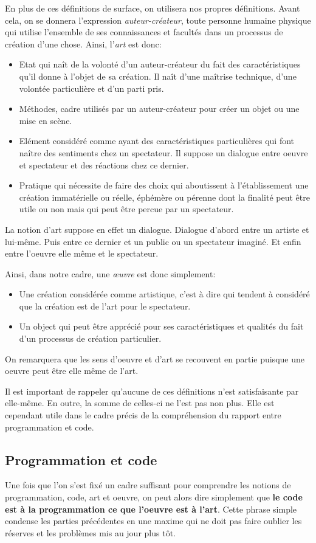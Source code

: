 \documentclass[12pt]{article} %
\begin{document}
En plus de ces définitions de surface, on utilisera nos propres définitions. Avant cela, on se donnera l'expression \textit{auteur-créateur}, toute personne humaine physique qui utilise l'ensemble de ses connaissances et facultés dans un processus de création d'une chose. Ainsi, l'\textit{art} est donc:
\begin{itemize}
    \item Etat qui naît de la volonté d'un auteur-créateur du fait des caractéristiques qu'il donne à l'objet de sa création. Il naît d'une maîtrise technique, d'une volontée particulière et d'un parti pris.
    \item Méthodes, cadre utilisés par un auteur-créateur pour créer un objet ou une mise en scène.
    \item Elément considéré comme ayant des caractéristiques particulières qui font naître des sentiments chez un spectateur. Il suppose un dialogue entre oeuvre et spectateur et des réactions chez ce dernier.
    \item Pratique qui nécessite de faire des choix qui aboutissent à l'établissement une création immatérielle ou réelle, éphémère ou pérenne dont la finalité peut être utile ou non mais qui peut être percue par un spectateur.
\end{itemize}
La notion d'art suppose en effet un dialogue. Dialogue d'abord entre un artiste et lui-même. Puis entre ce dernier et un public ou un spectateur imaginé. Et enfin entre l'oeuvre elle même et le spectateur. 

Ainsi, dans notre cadre, une \textit{œuvre} est donc simplement:
\begin{itemize}
    \item Une création considérée comme artistique, c'est à dire qui tendent à considéré que la création est de l'art pour le spectateur.
    \item Un object qui peut être apprécié pour ses caractéristiques et qualités du fait d'un processus de création particulier.
\end{itemize}
On remarquera que les sens d'oeuvre et d'art se recouvent en partie puisque une oeuvre peut être elle même de l'art.

Il est important de rappeler qu'aucune de ces définitions n'est satisfaisante par elle-même. En outre, la somme de celles-ci ne l'est pas non plus. Elle est cependant utile dans le cadre précis de la compréhension du rapport entre programmation et code.

\subsection{Programmation et code} %
Une fois que l'on s'est fixé un cadre suffisant pour comprendre les notions de programmation, code, art et oeuvre, on peut alors dire simplement que \textbf{le code est à la programmation ce que l'oeuvre est à l'art}. Cette phrase simple condense les parties précédentes en une maxime qui ne doit pas faire oublier les réserves et les problèmes mis au jour plus tôt.
\end{document}
